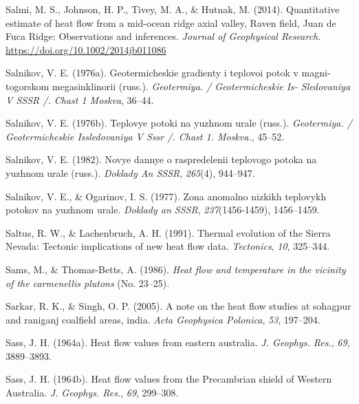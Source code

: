 \begin{CSLReferences}{1}{1}
\leavevmode{}%
Salmi, M. S., Johnson, H. P., Tivey, M. A., \& Hutnak, M. (2014). Quantitative estimate of heat flow from a mid-ocean ridge axial valley, {Raven field, Juan de Fuca Ridge:} Observations and inferences. \emph{Journal of Geophysical Research}. \url{https://doi.org/10.1002/2014jb011086}

\leavevmode{}%
Salnikov, V. E. (1976a). Geotermicheskie gradienty i teplovoi potok v magni- togorskom megasinklinorii (russ.). \emph{Geotermiya. / Geotermicheskie Is- Sledovaniya V SSSR /. Chast 1 Moskva}, 36--44.

\leavevmode{}%
Salnikov, V. E. (1976b). Teplovye potoki na yuzhnom urale (russ.). \emph{Geotermiya. / Geotermicheskie Issledovaniya V Sssr /. Chast 1. Moskva.}, 45--52.

\leavevmode{}%
Salnikov, V. E. (1982). Novye dannye o raspredelenii teplovogo potoka na yuzhnom urale (russ.). \emph{Doklady An SSSR}, \emph{265}(4), 944--947.

\leavevmode{}%
Salnikov, V. E., \& Ogarinov, I. S. (1977). Zona anomalno nizkikh teplovykh potokov na yuzhnom urale. \emph{Doklady an SSSR}, \emph{237}(1456-1459), 1456--1459.

\leavevmode{}%
Saltus, R. W., \& Lachenbruch, A. H. (1991). Thermal evolution of the {Sierra Nevada}: Tectonic implications of new heat flow data. \emph{Tectonics}, \emph{10}, 325--344.

\leavevmode{}%
Sams, M., \& Thomas-Betts, A. (1986). \emph{Heat flow and temperature in the vicinity of the carmenellis plutons} (No. 23--25).

\leavevmode{}%
Sarkar, R. K., \& Singh, O. P. (2005). A note on the heat flow studies at sohagpur and raniganj coalfield areas, india. \emph{Acta Geophysica Polonica}, \emph{53}, 197--204.

\leavevmode{}%
Sass, J. H. (1964a). Heat flow values from eastern australia. \emph{J. Geophys. Res.}, \emph{69}, 3889--3893.

\leavevmode{}%
Sass, J. H. (1964b). Heat flow values from the {Precambrian shield of Western Australia}. \emph{J. Geophys. Res.}, \emph{69}, 299--308.


\end{CSLReferences}
